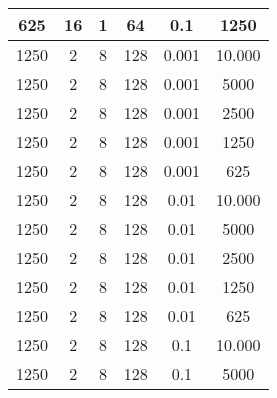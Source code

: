 \begin{tabularx}{\linewidth}{ |c|c|c|c|c|c|  }
    625  & 16  & 1     & 64  & 0.1   & 1250                                                                                                                               \\
    \hline
    1250 & 2   & 8     & 128 & 0.001 & 10.000                                                                                                                             \\
    1250 & 2   & 8     & 128 & 0.001 & 5000                                                                                                                               \\
    1250 & 2   & 8     & 128 & 0.001 & 2500                                                                                                                               \\
    1250 & 2   & 8     & 128 & 0.001 & 1250                                                                                                                               \\
    1250 & 2   & 8     & 128 & 0.001 & 625                                                                                                                                \\
    1250 & 2   & 8     & 128 & 0.01  & 10.000                                                                                                                             \\
    1250 & 2   & 8     & 128 & 0.01  & 5000                                                                                                                               \\
    1250 & 2   & 8     & 128 & 0.01  & 2500                                                                                                                               \\
    1250 & 2   & 8     & 128 & 0.01  & 1250                                                                                                                               \\
    1250 & 2   & 8     & 128 & 0.01  & 625                                                                                                                                \\
    1250 & 2   & 8     & 128 & 0.1   & 10.000                                                                                                                             \\
    1250 & 2   & 8     & 128 & 0.1   & 5000                                                                                                                               \\

\end{tabularx}
